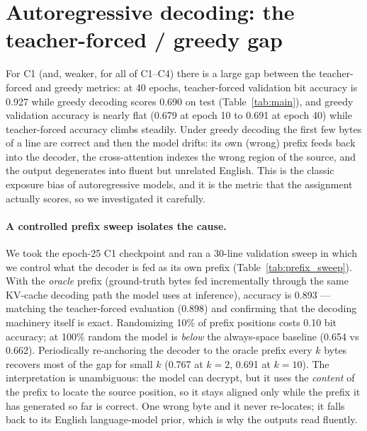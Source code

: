 \documentclass[11pt]{article}
\begin{document}
\section{Autoregressive decoding: the teacher-forced / greedy gap}
\label{sec:exposure}
For C1 (and, weaker, for all of C1--C4) there is a large gap between the
teacher-forced and greedy metrics: at 40 epochs, teacher-forced validation bit
accuracy is 0.927 while greedy decoding scores 0.690 on test (Table~\ref{tab:main}),
and greedy validation accuracy is nearly flat (0.679 at epoch 10 to 0.691 at
epoch 40) while teacher-forced accuracy climbs steadily. Under greedy decoding the
first few bytes of a line are correct and then the model drifts: its own (wrong)
prefix feeds back into the decoder, the cross-attention indexes the wrong region
of the source, and the output degenerates into fluent but unrelated English. This
is the classic exposure bias of autoregressive models, and it is the metric that
the assignment actually scores, so we investigated it carefully.

\paragraph{A controlled prefix sweep isolates the cause.}
We took the epoch-25 C1 checkpoint and ran a 30-line validation sweep in which we
control what the decoder is fed as its own prefix (Table~\ref{tab:prefix_sweep}).
With the \emph{oracle} prefix (ground-truth bytes fed incrementally through the
same KV-cache decoding path the model uses at inference), accuracy is 0.893 ---
matching the teacher-forced evaluation (0.898) and confirming that the decoding
machinery itself is exact. Randomizing 10\% of prefix positions costs 0.10 bit
accuracy; at 100\% random the model is \emph{below} the always-space baseline
(0.654 vs 0.662). Periodically re-anchoring the decoder to the oracle prefix every
$k$ bytes recovers most of the gap for small $k$ (0.767 at $k{=}2$, 0.691 at
$k{=}10$). The interpretation is unambiguous: the model can decrypt, but it uses
the \emph{content} of the prefix to locate the source position, so it stays
aligned only while the prefix it has generated so far is correct. One wrong byte
and it never re-locates; it falls back to its English language-model prior, which
is why the outputs read fluently.
\end{document}
